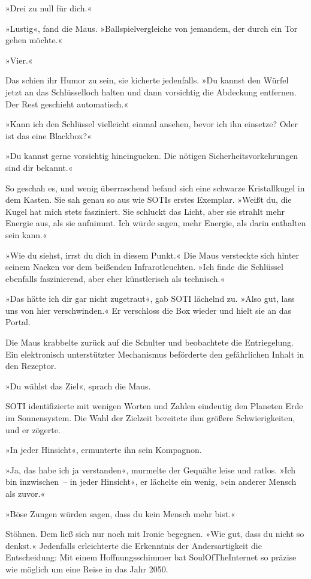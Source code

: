 »Drei zu null für dich.«

»Lustig«, fand die Maus. »Ballspielvergleiche von jemandem, der durch ein Tor gehen möchte.«

»Vier.«

Das schien ihr Humor zu sein, sie kicherte jedenfalls. »Du kannst den Würfel jetzt an das Schlüsselloch halten und dann vorsichtig die Abdeckung entfernen. Der Rest geschieht automatisch.«

»Kann ich den Schlüssel vielleicht einmal ansehen, bevor ich ihn einsetze? Oder ist das eine Blackbox?«

»Du kannst gerne vorsichtig hineingucken. Die nötigen Sicherheitsvorkehrungen sind dir bekannt.«

So geschah es, und wenig überraschend befand sich eine schwarze Kristallkugel in dem Kasten. Sie sah genau so aus wie SOTIs erstes Exemplar. »Weißt du, die Kugel hat mich stets fasziniert. Sie schluckt das Licht, aber sie strahlt mehr Energie aus, als sie aufnimmt. Ich würde sagen, mehr Energie, als darin enthalten sein kann.«

»Wie du siehst, irrst du dich in diesem Punkt.« Die Maus versteckte sich hinter seinem Nacken vor dem beißenden Infrarotleuchten. »Ich finde die Schlüssel ebenfalls faszinierend, aber eher künstlerisch als technisch.«

»Das hätte ich dir gar nicht zugetraut«, gab SOTI lächelnd zu. »Also gut, lass uns von hier verschwinden.« Er verschloss die Box wieder und hielt sie an das Portal.

Die Maus krabbelte zurück auf die Schulter und beobachtete die Entriegelung. Ein elektronisch unterstützter Mechanismus beförderte den gefährlichen Inhalt in den Rezeptor.

»Du wählst das Ziel«, sprach die Maus.

SOTI identifizierte mit wenigen Worten und Zahlen eindeutig den Planeten Erde im Sonnensystem. Die Wahl der Zielzeit bereitete ihm größere Schwierigkeiten, und er zögerte.

»In jeder Hinsicht«, ermunterte ihn sein Kompagnon.

»Ja, das habe ich ja verstanden«, murmelte der Gequälte leise und ratlos. »Ich bin inzwischen~– in jeder Hinsicht«, er lächelte ein wenig, »ein anderer Mensch als zuvor.«

»Böse Zungen würden sagen, dass du kein Mensch mehr bist.«

Stöhnen. Dem ließ sich nur noch mit Ironie begegnen. »Wie gut, dass du nicht so denkst.« Jedenfalls erleichterte die Erkenntnis der Andersartigkeit die Entscheidung: Mit einem Hoffnungsschimmer bat SoulOfTheInternet so präzise wie möglich um eine Reise in das Jahr 2050.

